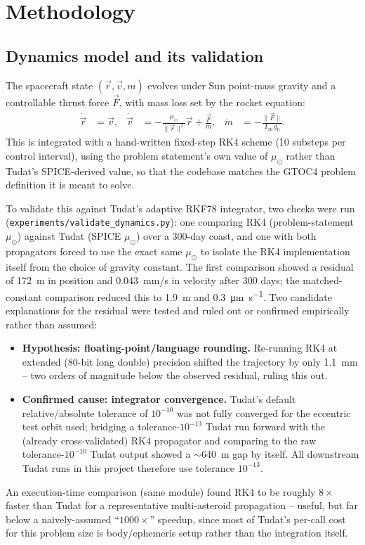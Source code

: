 \chapter{Methodology}
\label{chapter:methodology}

\section{Dynamics model and its validation}
\label{sec:dynamics}

The spacecraft state $(\vec{r}, \vec{v}, m)$ evolves under Sun point-mass gravity and a
controllable thrust force $\vec{F}$, with mass loss set by the rocket equation:
\begin{align}
  \dot{\vec r} &= \vec v, &
  \dot{\vec v} &= -\frac{\mu_\odot}{\lVert\vec r\rVert^3}\vec r + \frac{\vec F}{m}, &
  \dot m &= -\frac{\lVert\vec F\rVert}{I_{sp}\,g_0}.
\end{align}
This is integrated with a hand-written fixed-step RK4 scheme (10 substeps per control interval),
using the problem statement's own value of $\mu_\odot$ rather than Tudat's SPICE-derived value, so
that the codebase matches the GTOC4 problem definition it is meant to solve.

To validate this against Tudat's adaptive RKF78 integrator, two checks were run
(\texttt{experiments/validate\_dynamics.py}): one comparing RK4 (problem-statement $\mu_\odot$)
against Tudat (SPICE $\mu_\odot$) over a 300-day coast, and one with both propagators forced to
use the exact same $\mu_\odot$ to isolate the RK4 implementation itself from the choice of gravity
constant. The first comparison showed a residual of \SI{172}{m} in position and \SI{0.043}{mm/s}
in velocity after 300 days; the matched-constant comparison reduced this to \SI{1.9}{m} and
\SI{0.3}{\micro\meter\per\second}. Two candidate explanations for the residual were tested and ruled out or
confirmed empirically rather than assumed:
\begin{itemize}
  \item \textbf{Hypothesis: floating-point/language rounding.} Re-running RK4 at extended
        (80-bit long double) precision shifted the trajectory by only \SI{1.1}{mm} -- two orders
        of magnitude below the observed residual, ruling this out.
  \item \textbf{Confirmed cause: integrator convergence.} Tudat's default relative/absolute
        tolerance of $10^{-10}$ was not fully converged for the eccentric test orbit used;
        bridging a tolerance-$10^{-13}$ Tudat run forward with the (already cross-validated) RK4
        propagator and comparing to the raw tolerance-$10^{-10}$ Tudat output showed a
        $\sim$\SI{640}{m} gap by itself. All downstream Tudat runs in this project therefore use
        tolerance $10^{-13}$.
\end{itemize}
An execution-time comparison (same module) found RK4 to be roughly $8\times$ faster than
Tudat for a representative multi-asteroid propagation -- useful, but far below a
naively-assumed ``$1000\times$'' speedup, since most of Tudat's per-call cost for this problem
size is body/ephemeris setup rather than the integration itself.

